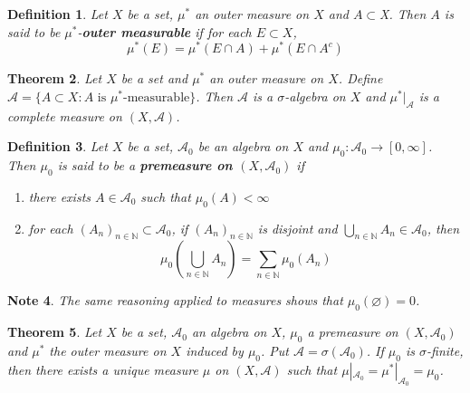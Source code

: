 \documentclass[12pt]{amsart}
\newtheorem{thm}{Theorem}[subsection]
\newtheorem{defn}[thm]{Definition}
\newtheorem{note}[thm]{Note}
\newcommand{\sig}{\sigma}
\newcommand{\N}{\mathbb{N}}
\newcommand{\MA}{\mathcal{A}}
\begin{document}
	\begin{defn}
		Let $X$ be a set, $\mu^*$ an outer measure on $X$ and $A \subset $X. Then $A$ is said to be $\mu^*$-\textbf{outer measurable} if for each $E \subset X$, $$\mu^*(E) = \mu^*(E \cap A) + \mu^*(E \cap A^c)$$ 
	\end{defn}
	
	\begin{thm}
		Let $X$ be a set and $\mu^*$ an outer measure on $X$. Define $\MA = \{A \subset X: A \text{ is }\mu^*\text{-measurable}\}$. Then $\MA$ is a $\sig$-algebra on $X$ and $\mu^*|_{\MA}$ is a complete measure on $(X, \MA)$.
	\end{thm}
	
	\begin{defn}
		Let $X$ be a set, $\MA_0$ be an algebra on $X$ and $\mu_0:\MA_0 \rightarrow [0, \infty]$. Then $\mu_0$ is said to be a \textbf{premeasure on $(X,\MA_0)$} if 
		\begin{enumerate}
			\item there exists $A \in \MA_0$ such that $\mu_0(A)< \infty$
			\item for each $(A_n)_{n \in \N} \subset \MA_0$, if $(A_n)_{n \in \N}$ is disjoint and $\bigcup\limits_{n \in \N}A_n \in \MA_0$, then $$\mu_0(\bigcup_{n\in \N}A_n) = \sum_{n \in \N}\mu_0(A_n)$$
		\end{enumerate}
	\end{defn}
	
	\begin{note}
		The same reasoning applied to measures shows that $\mu_0(\varnothing) = 0$.
	\end{note}
	
	\begin{thm}
		Let $X$ be a set, $\MA_0$ an algebra on $X$, $\mu_0$ a premeasure on $(X,\MA_0)$ and $\mu^*$ the outer measure on $X$ induced by $\mu_0$. Put $\MA = \sig(\MA_0)$. If $\mu_0$ is $\sig$-finite, then there exists a unique measure $\mu$ on $(X, \MA)$ such that $\mu|_{\MA_0} = \mu^*|_{\MA_0} = \mu_0$. 
	\end{thm}
	
	
	
	
	
	
	
	
	
	
	
	
	
	
	
	
	
	
	
	
	
\end{document}
